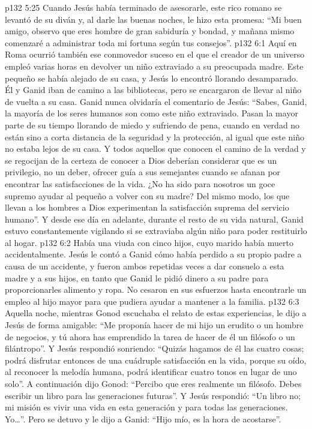 \vs p132 5:25 \pc Cuando Jesús había terminado de asesorarle, este rico romano se levantó de su diván y, al darle las buenas noches, le hizo esta promesa: “Mi buen amigo, observo que eres hombre de gran sabiduría y bondad, y mañana mismo comenzaré a administrar toda mi fortuna según tus consejos”.
\vs p132 6:1 Aquí en Roma ocurrió también ese conmovedor suceso en el que el creador de un universo empleó varias horas en devolver un niño extraviado a su preocupada madre. Este pequeño se había alejado de su casa, y Jesús lo encontró llorando desamparado. Él y Ganid iban de camino a las bibliotecas, pero se encargaron de llevar al niño de vuelta a su casa. Ganid nunca olvidaría el comentario de Jesús: “Sabes, Ganid, la mayoría de los seres humanos son como este niño extraviado. Pasan la mayor parte de su tiempo llorando de miedo y sufriendo de pena, cuando en verdad no están sino a corta distancia de la seguridad y la protección, al igual que este niño no estaba lejos de su casa. Y todos aquellos que conocen el camino de la verdad y se regocijan de la certeza de conocer a Dios deberían considerar que es un privilegio, no un deber, ofrecer guía a sus semejantes cuando se afanan por encontrar las satisfacciones de la vida. ¿No ha sido para nosotros un goce supremo ayudar al pequeño a volver con su madre? Del mismo modo, los que llevan a los hombres a Dios experimentan la satisfacción suprema del servicio humano”. Y desde ese día en adelante, durante el resto de su vida natural, Ganid estuvo constantemente vigilando si se extraviaba algún niño para poder restituirlo al hogar.
\vs p132 6:2 \pc Había una viuda con cinco hijos, cuyo marido había muerto accidentalmente. Jesús le contó a Ganid cómo había perdido a su propio padre a causa de un accidente, y fueron ambos repetidas veces a dar consuelo a esta madre y a sus hijos, en tanto que Ganid le pidió dinero a su padre para proporcionarles alimento y ropa. No cesaron en sus esfuerzos hasta encontrarle un empleo al hijo mayor para que pudiera ayudar a mantener a la familia.
\vs p132 6:3 \pc Aquella noche, mientras Gonod escuchaba el relato de estas experiencias, le dijo a Jesús de forma amigable: “Me proponía hacer de mi hijo un erudito o un hombre de negocios, y tú ahora has emprendido la tarea de hacer de él un filósofo o un filántropo”. Y Jesús respondió sonriendo: “Quizás hagamos de él las cuatro cosas; podrá disfrutar entonces de una cuádruple satisfacción en la vida, porque su oído, al reconocer la melodía humana, podrá identificar cuatro tonos en lugar de uno solo”. A continuación dijo Gonod: “Percibo que eres realmente un filósofo. Debes escribir un libro para las generaciones futuras”. Y Jesús respondió: “Un libro no; mi misión es vivir una vida en esta generación y para todas las generaciones. Yo\ldots ”. Pero se detuvo y le dijo a Ganid: “Hijo mío, es la hora de acostarse”.
